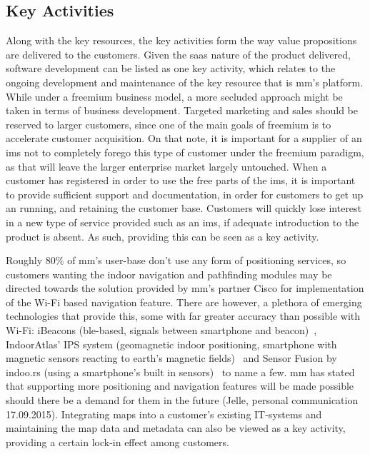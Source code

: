 \subsection{Key Activities}
Along with the key resources, the key activities form the way value propositions are delivered to the customers. Given the \gls{saas} nature of the product delivered, software development can be listed as one key activity, which relates to the ongoing development and maintenance of the key resource that is \gls{mm}'s platform. While under a freemium business model, a more secluded approach might be taken in terms of business development. Targeted marketing and sales should be reserved to larger customers, since one of the main goals of freemium is to accelerate customer acquisition. On that note, it is important for a supplier of an \gls{ims} not to completely forego this type of customer under the freemium paradigm, as that will leave the larger enterprise market largely untouched. When a customer has registered in order to use the free parts of the \gls{ims}, it is important to provide sufficient support and documentation, in order for customers to get up an running, and retaining the customer base. Customers will quickly lose interest in a new type of service provided such as an \gls{ims}, if adequate introduction to the product is absent. As such, providing this can be seen as a key activity. 


Roughly 80\% of \gls{mm}'s user-base don't use any form of positioning services, so customers wanting the indoor navigation and pathfinding modules may be directed towards the solution provided by \gls{mm}'s partner Cisco for implementation of the Wi-Fi based navigation feature. There are however, a plethora of emerging technologies that provide this, some with far greater accuracy than possible with Wi-Fi: iBeacons (\gls{ble}-based, signals between smartphone and beacon)~\cite{ibeacon2016}, IndoorAtlas' IPS system (geomagnetic indoor positioning, smartphone with magnetic sensors reacting to earth's magnetic fields)~\cite{indooratlas2016} and Sensor Fusion by indoo.rs (using a smartphone's built in sensors)~\cite{indoo.rs2016} to name a few. \gls{mm} has stated that supporting more positioning and navigation features will be made possible should there be a demand for them in the future (Jelle, personal communication 17.09.2015). Integrating maps into a customer's existing IT-systems and maintaining the map data and metadata can also be viewed as a key activity, providing a certain lock-in effect among customers. 


